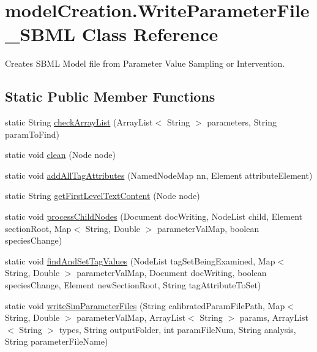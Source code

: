 \hypertarget{classmodelCreation_1_1WriteParameterFile__SBML}{}\section{model\+Creation.\+Write\+Parameter\+File\+\_\+\+S\+B\+M\+L Class Reference}
\label{classmodelCreation_1_1WriteParameterFile__SBML}


Creates S\+B\+M\+L Model file from Parameter Value Sampling or Intervention.  


\subsection*{Static Public Member Functions}
\begin{DoxyCompactItemize}
\item 
static String \hyperlink{classmodelCreation_1_1WriteParameterFile__SBML_ad4b6b36bcaa53bf2793e871d9adb7e21}{check\+Array\+List} (Array\+List$<$ String $>$ parameters, String param\+To\+Find)
\item 
static void \hyperlink{classmodelCreation_1_1WriteParameterFile__SBML_a25306744192786981b93fdd732f6ae7a}{clean} (Node node)
\item 
static void \hyperlink{classmodelCreation_1_1WriteParameterFile__SBML_a0d3279674a786dd78edc17a184142f88}{add\+All\+Tag\+Attributes} (Named\+Node\+Map nn, Element attribute\+Element)
\item 
static String \hyperlink{classmodelCreation_1_1WriteParameterFile__SBML_a532737a41659f2e6e4c15a2e33a6c922}{get\+First\+Level\+Text\+Content} (Node node)
\item 
static void \hyperlink{classmodelCreation_1_1WriteParameterFile__SBML_add22a1d078e2eaf0b6ad566edab22238}{process\+Child\+Nodes} (Document doc\+Writing, Node\+List child, Element section\+Root, Map$<$ String, Double $>$ parameter\+Val\+Map, boolean species\+Change)
\item 
static void \hyperlink{classmodelCreation_1_1WriteParameterFile__SBML_a57b2b617184402ae468bf8bdb142f346}{find\+And\+Set\+Tag\+Values} (Node\+List tag\+Set\+Being\+Examined, Map$<$ String, Double $>$ parameter\+Val\+Map, Document doc\+Writing, boolean species\+Change, Element new\+Section\+Root, String tag\+Attribute\+To\+Set)
\item 
static void \hyperlink{classmodelCreation_1_1WriteParameterFile__SBML_a943b80e0f50681b2f1126dbab59d55cc}{write\+Sim\+Parameter\+Files} (String calibrated\+Param\+File\+Path, Map$<$ String, Double $>$ parameter\+Val\+Map, Array\+List$<$ String $>$ params, Array\+List$<$ String $>$ types, String output\+Folder, int param\+File\+Num, String analysis, String parameter\+File\+Name)
\end{DoxyCompactItemize}
